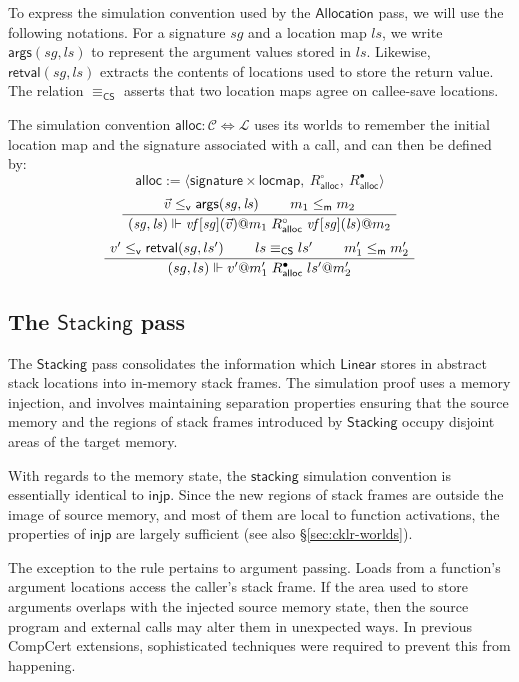 \documentclass[sigplan,screen,review]{acmart}
\newcommand{\kw}[1]{\ensuremath{ \mathsf{#1} }}
\newcommand{\que}{\circ}
\newcommand{\ans}{\bullet}
\newcommand{\vref}{\le_\kw{v}}
\newcommand{\mext}{\le_\kw{m}}
\newenvironment{optional}{}{}
\begin{document}
\begin{optional}
To express the simulation convention used by the \kw{Allocation} pass,
we will use the following notations.
For a signature $\mathit{sg}$ and a location map $\mathit{ls}$,
we write $\kw{args}(\mathit{sg}, \mathit{ls})$
to represent the argument values stored in $\mathit{ls}$.
Likewise,
$\kw{retval}(\mathit{sg}, \mathit{ls})$ extracts
the contents of locations used to store the return value.
The relation $\equiv_\kw{CS}$ asserts that
two location maps agree on callee-save locations.

The simulation convention
$\kw{alloc} : \mathcal{C} \Leftrightarrow \mathcal{L}$
uses its worlds to remember the initial location map
and the signature associated with a call,
and can then be defined by:
\[
  \kw{alloc} := \langle
      \kw{signature} \times \kw{locmap}, \:
      R_\kw{alloc}^\que, \:
      R_\kw{alloc}^\ans \rangle
\]
\[
  \AxiomC{$\vec{v} \vref \kw{args}(\mathit{sg}, \mathit{ls})$}
  \AxiomC{$m_1 \mext m_2$}
  \BinaryInfC{$
      (\mathit{sg}, \mathit{ls}) \Vdash
      \mathit{vf}[\mathit{sg}](\vec{v})@m_1
      \mathrel{R_\kw{alloc}^\que}
      \mathit{vf}[\mathit{sg}](\mathit{ls})@m_2$}
  \DisplayProof
\]
\[
  \AxiomC{$v' \vref \kw{retval}(sg, ls')$}
  \AxiomC{$ls \equiv_\kw{CS} ls'$}
  \AxiomC{$m_1' \mext m_2'$}
  \TrinaryInfC{$
      (sg, ls) \Vdash
      v'@m_1'
      \mathrel{R_\kw{alloc}^\ans}
      ls'@m_2'$}
  \DisplayProof
\]


\subsection{The \kw{Stacking} pass} \label{sec:stacking} %

The \kw{Stacking} pass
consolidates the information which
\kw{Linear} stores in abstract stack locations
into in-memory stack frames.
The simulation proof uses a memory injection,
and involves maintaining separation properties
ensuring that the source memory and
the regions of stack frames
introduced by \kw{Stacking}
occupy disjoint areas of the target memory.

With regards to the memory state,
the \kw{stacking} simulation convention
is essentially identical to \kw{injp}.
Since the new regions of stack frames
are outside the image of source memory,
and most of them are local to
function activations,
the properties of \kw{injp}
are largely sufficient
(see also \S\ref{sec:cklr-worlds}).

The exception to the rule pertains to argument passing.
Loads from a function's argument locations
access the caller's stack frame.
If the area used to store arguments
overlaps with the injected source memory state,
then the source program and external calls
may alter them in unexpected ways.
In previous CompCert extensions,
sophisticated techniques were required
to prevent this from happening.


\end{optional}
\end{document}
